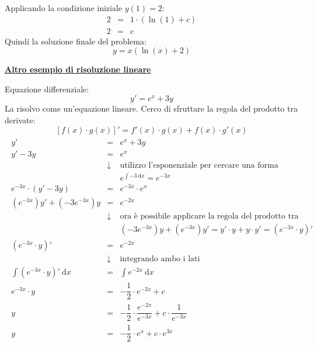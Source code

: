 \documentclass[a4paper]{article}
\newcommand{\example}[1]{\textcolor{Green4}{\textbf{#1}}}
\begin{document}
	Applicando la condizione iniziale $y\left(1\right) = 2$:
	\begin{equation*}
		\begin{array}{rcl}
			2 &=& 1 \cdot \left(\ln\left(1\right) + c\right) \\
			2 &=& c
		\end{array}
	\end{equation*}
	Quindi la soluzione finale del problema:
	\begin{equation*}
		y = x\left(\ln\left(x\right) + 2\right)
	\end{equation*}\newpage

	\begin{flushleft}
		\example{\underline{Altro esempio di risoluzione lineare}}
	\end{flushleft}
	Equazione differenziale:
	\begin{equation*}
		y' = e^{x} + 3y
	\end{equation*}
	La risolvo come un'equazione lineare. Cerco di sfruttare la regola del prodotto tra derivate:
	\begin{equation*}
		\left[f\left(x\right) \cdot g\left(x\right)\right]' = f'\left(x\right) \cdot g\left(x\right) + f\left(x\right) \cdot g'\left(x\right)
	\end{equation*}
	\begin{gather*}
		\begin{array}{rcl}
			y' &=& e^{x} + 3y \\ [.3em]
			y' - 3y &=& e^{x} \\ [1em]
			&\downarrow& \text{utilizzo l'esponenziale per cercare una forma accettabile} \\ [.3em]
			&& \displaystyle e^{\int -3 \:\mathrm{d}x} = e^{-3x} \\ [1em]
			e^{-3x} \cdot \left(y' - 3y\right) &=& e^{-3x} \cdot e^{x} \\ [.3em]
			\left(e^{-3x}\right)y' + \left(-3e^{-3x}\right)y &=& e^{-2x} \\ [1em]
			&\downarrow& \text{ora è possibile applicare la regola del prodotto tra derivate} \\ [.3em]
			&& \left(-3e^{-3x}\right)y + \left(e^{-3x}\right)y' = y' \cdot y + y \cdot y' = (e^{-3x} \cdot y)' \\ [1em]
			(e^{-3x} \cdot y)' &=& e^{-2x} \\ [1em]
			&\downarrow& \text{integrando ambo i lati} \\ [1em]
			\displaystyle\int(e^{-3x} \cdot y)' \:\mathrm{d}x &=& \displaystyle\int e^{-2x} \:\mathrm{d}x \\ [1em]
			e^{-3x} \cdot y &=& - \dfrac{1}{2} \cdot e^{-2x} + c \\ [1em]
			y &=& -\dfrac{1}{2} \cdot \dfrac{e^{-2x}}{e^{-3x}} + c \cdot \dfrac{1}{e^{-3x}} \\ [1em]
			y &=& -\dfrac{1}{2} \cdot e^{x} + c \cdot e^{3x}
		\end{array}
	\end{gather*}
	\newpage
\end{document}
